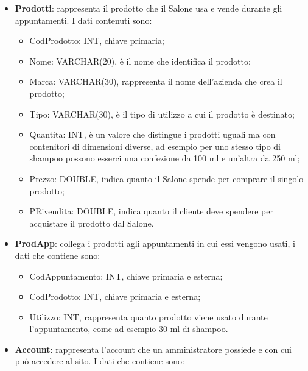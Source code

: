 {{\begin{itemize}
\begin{itemize}
						\item CodCliente: INT, chiave esterna;
						\item DataOra: DATETIME, è un formato che contiene una data e un'ora, la prima è strutturata in modo uguale a DataNascita di Clienti, l'ora invece ha un formato del tipo hh:mm:ss, dove `h' rappresenta le cifre dell'ora, `m' quelle dei minuti e `s' quelle dei secondi;
						\item CodTipoAppuntamento: INT, chiave esterna.
					\end{itemize}
				\item \textbf{Prodotti}: rappresenta il prodotto che il Salone usa e vende durante gli appuntamenti. I dati contenuti sono:
					\begin{itemize}\itemsep1pt
						\item CodProdotto: INT, chiave primaria;
						\item Nome: VARCHAR(20), è il nome che identifica il prodotto;
						\item Marca: VARCHAR(30), rappresenta il nome dell'azienda che crea il prodotto;
						\item Tipo: VARCHAR(30), è il tipo di utilizzo a cui il prodotto è destinato;
						\item Quantita: INT, è un valore che distingue i prodotti uguali ma con contenitori di dimensioni diverse, ad esempio per uno stesso tipo di shampoo possono esserci una confezione da 100 ml e un'altra da 250 ml;
						\item Prezzo: DOUBLE, indica quanto il Salone spende per comprare il singolo prodotto;
						\item PRivendita: DOUBLE, indica quanto il cliente deve spendere per acquistare il prodotto dal Salone.
					\end{itemize}
				\item \textbf{ProdApp}: collega i prodotti agli appuntamenti in cui essi vengono usati, i dati che contiene sono:
					\begin{itemize}\itemsep1pt
						\item CodAppuntamento: INT, chiave primaria e esterna;
						\item CodProdotto: INT, chiave primaria e esterna;
						\item Utilizzo: INT, rappresenta quanto prodotto viene usato durante l'appuntamento, come ad esempio 30 ml di shampoo.
					\end{itemize}
				\item \textbf{Account}: rappresenta l'account che un amministratore possiede e con cui può accedere al sito. I dati che contiene sono:

\end{itemize}}}
